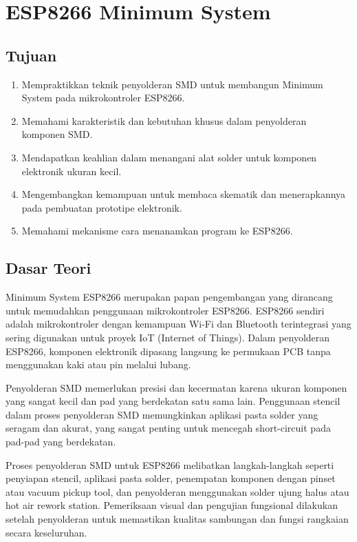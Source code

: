 \chapter{ESP8266 Minimum System}

\section{Tujuan}
\begin{enumerate}
    \item Mempraktikkan teknik penyolderan SMD untuk membangun Minimum System pada mikrokontroler ESP8266.
    \item Memahami karakteristik dan kebutuhan khusus dalam penyolderan komponen SMD.
    \item Mendapatkan keahlian dalam menangani alat solder untuk komponen elektronik ukuran kecil.
    \item Mengembangkan kemampuan untuk membaca skematik dan menerapkannya pada pembuatan prototipe elektronik.
    \item Memahami mekanisme cara menanamkan program ke ESP8266.
\end{enumerate}

\section{Dasar Teori}
Minimum System ESP8266 merupakan papan pengembangan yang dirancang untuk memudahkan penggunaan mikrokontroler ESP8266. ESP8266 sendiri adalah mikrokontroler dengan kemampuan Wi-Fi dan Bluetooth terintegrasi yang sering digunakan untuk proyek IoT (Internet of Things). Dalam penyolderan ESP8266, komponen elektronik dipasang langsung ke permukaan PCB tanpa menggunakan kaki atau pin melalui lubang. 

Penyolderan SMD memerlukan presisi dan kecermatan karena ukuran komponen yang sangat kecil dan pad yang berdekatan satu sama lain. Penggunaan stencil dalam proses penyolderan SMD memungkinkan aplikasi pasta solder yang seragam dan akurat, yang sangat penting untuk mencegah short-circuit pada pad-pad yang berdekatan.

Proses penyolderan SMD untuk ESP8266 melibatkan langkah-langkah seperti penyiapan stencil, aplikasi pasta solder, penempatan komponen dengan pinset atau vacuum pickup tool, dan penyolderan menggunakan solder ujung halus atau hot air rework station. Pemeriksaan visual dan pengujian fungsional dilakukan setelah penyolderan untuk memastikan kualitas sambungan dan fungsi rangkaian secara keseluruhan.

